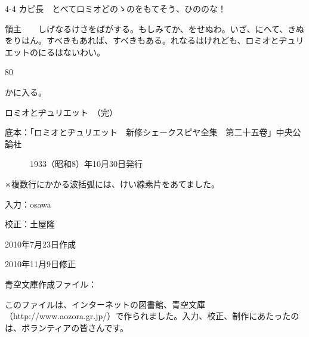 \documentclass[tate,paper=b6j,jafontsize=9pt]{jlreq}
\begin{document}
\begin{azconvIndented}{4\zw}{-4\zw}
カピ長　とべてロミオどのゝのをもてそう、ひののな！

領主　　しげなるけさをばがする。もしみてか、をせぬわ。いざ、にへて、きぬをりはん。すべきもあれば、すべきもある。れなるはけれども、ロミオとヂュリエットのにるはないわい。

\end{azconvIndented}
\begin{azconvIndented}{8\zw}{0\zw}

かに入る。

\end{azconvIndented}
ロミオとヂュリエット　（完）




\newpage
底本：「ロミオとヂュリエット　新修シェークスピヤ全集　第二十五卷」中央公論社

　　　1933（昭和8）年10月30日発行

※複数行にかかる波括弧には、けい線素片をあてました。

入力：osawa

校正：土屋隆

2010年7月23日作成

2010年11月9日修正

青空文庫作成ファイル：

このファイルは、インターネットの図書館、青空文庫（http://www.aozora.gr.jp/）で作られました。入力、校正、制作にあたったのは、ボランティアの皆さんです。
\end{document}
